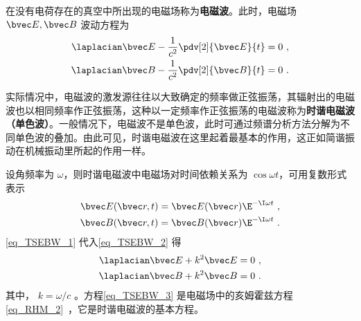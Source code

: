 
在没有电荷存在的真空中所出现的电磁场称为\textbf{电磁波}。此时，电磁场 $\bvec E,\bvec B$ 波动方程为
\begin{equation}\label{eq_TSEBW_2}
\begin{aligned}
\laplacian\bvec E-\frac{1}{c^2}\pdv[2]{\bvec E}{t}=0~,\\
\laplacian\bvec B-\frac{1}{c^2}\pdv[2]{\bvec B}{t}=0~.
\end{aligned}
\end{equation}

实际情况中，电磁波的激发源往往以大致确定的频率做正弦振荡，其辐射出的电磁波也以相同频率作正弦振荡，这种以一定频率作正弦振荡的电磁波称为\textbf{时谐电磁波（单色波）}。一般情况下，电磁波不是单色波，此时可通过频谱分析方法分解为不同单色波的叠加。由此可见，时谐电磁波在这里起着最基本的作用，这正如简谐振动在机械振动里所起的作用一样。

设角频率为 $\omega$，则时谐电磁波中电磁场对时间依赖关系为 $\cos\omega t$，可用复数形式表示
\begin{equation}\label{eq_TSEBW_1}
\begin{aligned}
\bvec E(\bvec r,t)=\bvec E(\bvec r)\E^{-\I\omega t}~,\\
\bvec B(\bvec r,t)=\bvec B(\bvec r)\E^{-\I\omega t}~.
\end{aligned}
\end{equation}
\autoref{eq_TSEBW_1} 代入\autoref{eq_TSEBW_2} 得
\begin{equation}\label{eq_TSEBW_3}
\begin{aligned}
\laplacian\bvec E+k^2\bvec E=0~,\\
\laplacian\bvec B+k^2\bvec B=0~.
\end{aligned}
\end{equation}
其中， $k=\omega/c$ 。方程\autoref{eq_TSEBW_3} 是电磁场中的亥姆霍兹方程\autoref{eq_RHM_2}~，它是时谐电磁波的基本方程。
